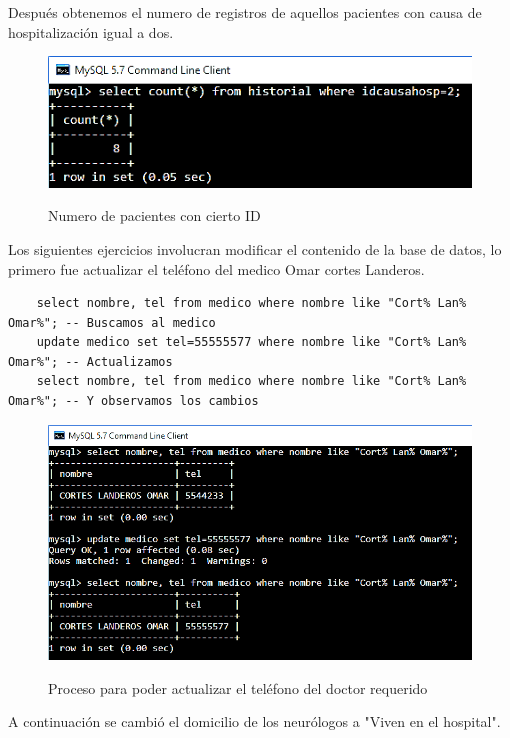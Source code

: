 \documentclass[12pt, titlepage]{article}
\begin{document}
	Después obtenemos el numero de registros de aquellos pacientes con causa de hospitalización igual a dos.
	\begin{figure}[H]
		\begin{center}
			\includegraphics[width=\textwidth]{img/quince.png}
			\label{fig:quince}
			\caption{Numero de pacientes con cierto ID}
		\end{center}
	\end{figure}
	Los siguientes ejercicios involucran modificar el contenido de la base de datos, lo primero fue actualizar el teléfono del medico Omar cortes Landeros.
	\begin{lstlisting}
	select nombre, tel from medico where nombre like "Cort% Lan% Omar%"; -- Buscamos al medico
	update medico set tel=55555577 where nombre like "Cort% Lan% Omar%"; -- Actualizamos
	select nombre, tel from medico where nombre like "Cort% Lan% Omar%"; -- Y observamos los cambios
	\end{lstlisting}
	\begin{figure}[H]
		\begin{center}
			\includegraphics[width=\textwidth]{img/16.png}
			\label{fig:16}
			\caption{Proceso para poder actualizar el teléfono del doctor requerido}
		\end{center}
	\end{figure}
	A continuación se cambió el domicilio de los neurólogos a "Viven en el hospital".
\end{document}
